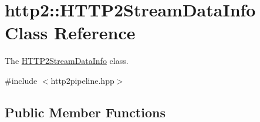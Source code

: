 \hypertarget{classhttp2_1_1HTTP2StreamDataInfo}{}\section{http2\+:\+:H\+T\+T\+P2\+Stream\+Data\+Info Class Reference}
\label{classhttp2_1_1HTTP2StreamDataInfo}


The \hyperlink{classhttp2_1_1HTTP2StreamDataInfo}{H\+T\+T\+P2\+Stream\+Data\+Info} class.  




{\ttfamily \#include $<$http2pipeline.\+hpp$>$}

\subsection*{Public Member Functions}
